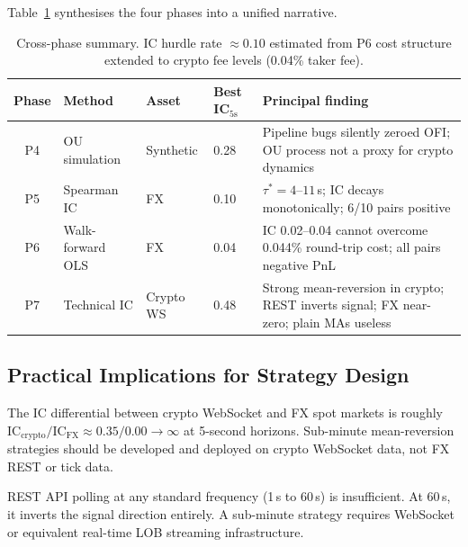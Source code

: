 \documentclass[12pt,a4paper]{article}
\theoremstyle{definition}
\theoremstyle{remark}
\newcommand{\IC}{\mathrm{IC}}
\begin{document}
Table~\ref{tab:synthesis} synthesises the four phases into a unified
narrative.

\begin{table}[H]
\centering
\caption{Cross-phase summary. IC hurdle rate $\approx 0.10$ estimated
  from P6 cost structure extended to crypto fee levels (0.04\% taker fee).}
\label{tab:synthesis}
\small
\setlength{\tabcolsep}{5pt}
\begin{tabular}{clll>{\RaggedRight\arraybackslash}p{5.2cm}}
\toprule
\textbf{Phase} & \textbf{Method} & \textbf{Asset}
  & \textbf{Best IC$_{5\text{s}}$} & \textbf{Principal finding} \\
\midrule
P4 & OU simulation & Synthetic & 0.28 &
  Pipeline bugs silently zeroed OFI; OU process not a proxy
  for crypto dynamics \\
P5 & Spearman IC & FX & 0.10 &
  $\tau^*=4$--$11$\,s; IC decays monotonically; 6/10 pairs
  positive \\
P6 & Walk-forward OLS & FX & 0.04 &
  IC 0.02--0.04 cannot overcome 0.044\% round-trip cost;
  all pairs negative PnL \\
P7 & Technical IC & Crypto WS & 0.48 &
  Strong mean-reversion in crypto; REST inverts signal;
  FX near-zero; plain MAs useless \\
\bottomrule
\end{tabular}
\end{table}

\subsection{Practical Implications for Strategy Design}
\label{sec:implications}

\begin{findingbox}
The IC differential between crypto WebSocket and FX spot markets is
roughly $\IC_\mathrm{crypto}/\IC_\mathrm{FX} \approx 0.35/0.00
\to\infty$ at 5-second horizons. Sub-minute mean-reversion strategies
should be developed and deployed on crypto WebSocket data, not FX
REST or tick data.
\end{findingbox}

\begin{findingbox}
REST API polling at any standard frequency (1\,s to 60\,s) is
insufficient. At 60\,s, it inverts the signal direction entirely.
A sub-minute strategy requires WebSocket or equivalent real-time
LOB streaming infrastructure.
\end{findingbox}
\end{document}
